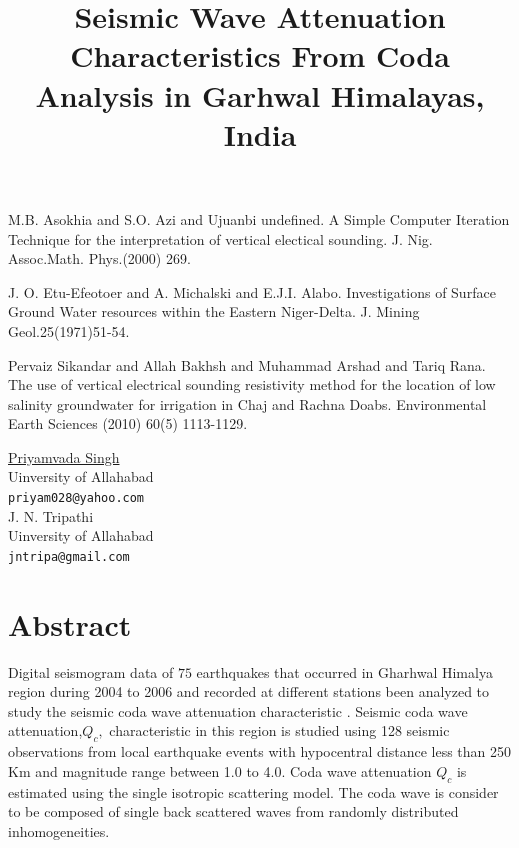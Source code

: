 \documentclass[article, A4, 11pt]{llncs}%
\begin{document}

\begin{thebibliography}{10}
{\sc M.B. Asokhia and S.O. Azi and Ujuanbi undefined}. {A Simple Computer Iteration Technique for the interpretation of vertical electical sounding}. J. Nig. Assoc.Math. Phys.(2000) 269.

{\sc J. O. Etu-Efeotoer and A. Michalski and E.J.I. Alabo}. {Investigations of Surface Ground Water resources within the Eastern Niger-Delta}. J. Mining Geol.25(1971)51-54.

{\sc  Pervaiz Sikandar and Allah Bakhsh and Muhammad Arshad and Tariq Rana}. {The use of vertical electrical sounding resistivity method for the location of low salinity groundwater for irrigation in Chaj and Rachna Doabs}.  Environmental Earth Sciences (2010) 60(5) 1113-1129.
\end{thebibliography} %

\title{Seismic Wave Attenuation Characteristics  From Coda Analysis in Garhwal Himalayas, India}
 \author{} \institute{}
\maketitle
\begin{center}
{\large \underline{Priyamvada Singh}}\\
Uinversity of Allahabad\\
{\tt priyam028@yahoo.com}
\\ \vspace{4mm}
{\large J. N. Tripathi}\\
Uinversity of Allahabad\\
{\tt jntripa@gmail.com}
\end{center}

\section*{Abstract}
Digital seismogram data of $75$ earthquakes that occurred in Gharhwal  Himalya region during 2004 to 2006 and recorded at different  stations been analyzed to study the seismic coda wave attenuation characteristic . Seismic coda wave attenuation,$Q_{c},$ characteristic in this region is studied using  128 seismic observations from local earthquake events with hypocentral distance less than 250 Km and magnitude range between 1.0 to 4.0. Coda wave attenuation $Q_{c}$ is estimated using the single isotropic scattering model. The coda wave is consider to be composed of single back scattered waves from randomly distributed inhomogeneities.
\end{document}
